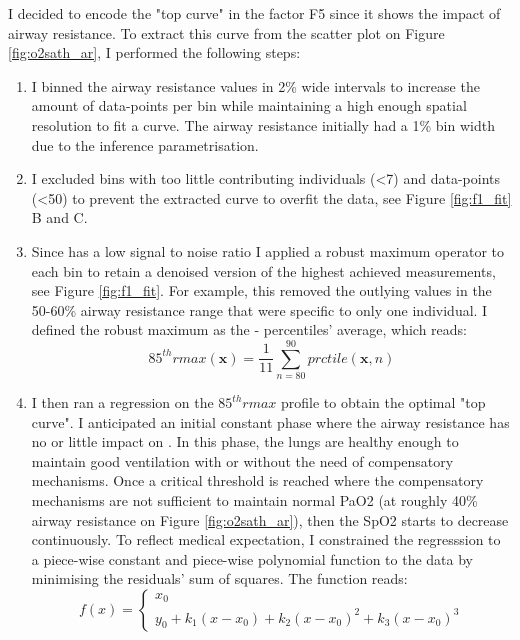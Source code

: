 
I decided to encode the "top curve" in the factor F5 since it shows the impact of airway resistance. To extract this curve from the scatter plot on Figure \ref{fig:o2sath_ar}, I performed the following steps:
\begin{enumerate}
    \item I binned the airway resistance values in 2\% wide intervals to increase the amount of data-points per bin while maintaining a high enough spatial resolution to fit a curve. The airway resistance initially had a 1\% bin width due to the inference parametrisation.
    \item I excluded bins with too little contributing individuals (<7) and data-points (<50) to prevent the extracted curve to overfit the data, see Figure \ref{fig:f1_fit} B and C.
    \item Since \OXSat has a low signal to noise ratio I applied a robust maximum operator to each bin to retain a denoised version of the highest achieved \OXSatPrct measurements, see Figure \ref{fig:f1_fit}. For example, this removed the outlying values in the 50-60\% airway resistance range that were specific to only one individual. I defined the robust maximum as the - percentiles' average, which reads:
    \begin{equation*}
        85^{th}\!rmax(\bm{x}) = \frac{1}{11} \sum_{n=80}^{90}prctile(\bm{x}, n)
    \end{equation*}
    \item I then ran a regression on the $85^{th}\!rmax$ profile to obtain the optimal "top curve".  I anticipated an initial constant phase where the airway resistance has no or little impact on \OXSat. In this phase, the lungs are healthy enough to maintain good ventilation with or without the need of compensatory mechanisms. Once a critical threshold is reached where the compensatory mechanisms are not sufficient to maintain normal PaO2 (at roughly 40\% airway resistance on Figure \ref{fig:o2sath_ar}), then the SpO2 starts to decrease continuously. To reflect medical expectation, I constrained the regresssion to a piece-wise constant and piece-wise polynomial function to the data by minimising the residuals' sum of squares. The function reads:
\begin{equation*}
    f(x) = 
    \begin{cases}
        x_0 \\
        y_0 + k_1(x-x_0)+k_2(x-x_0)^2+k_3(x-x_0)^3
    \end{cases}
\end{equation*}
\end{enumerate}
